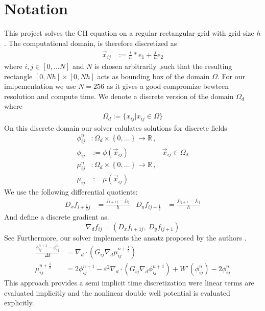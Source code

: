 \documentclass{mimosis}
\begin{document}
\section{Notation}
\label{sec:org9f007ea}
This project solves the CH equation on a regular rectangular grid with grid-size \(h\). The computational domain, is therefore discretized as
\begin{align}
\label{eq:4}
\vec{x}_{ij} &:= \frac{i}{h} * e_{1} + \frac{j}{h} e_2
\end{align}
where \(i,j \in [0 , \dots N]\) and \(N\) is chosen arbitrarily ,such that the resulting rectangle \([0 , Nh] \times [0,Nh]\) acts as bounding box of the domain \(\Omega\). For our imlpementation we use \(N=256\) as it gives a good compromize bewteen resolution and compute time. We denote a discrete version of the domain \(\Omega_d\) where
\begin{align}
\label{eq:8}
\Omega_d := \{x_{ij} | x_{ij} \in \Omega\}
\end{align}
On this discrete domain our solver calulates solutions for discrete fields
\begin{align}
\label{eq:5}
\phi_{ij}^n &: \Omega_d \times \left\{ 0, \dots  \right\} \to \mathbb{R} \,,\\
\phi_{ij} &:= \phi(\vec{x}_{ij}) & \vec{x}_{ij} \in \Omega_{d} \\
\mu_{ij}^n &: \Omega_d \times \left\{ 0, \dots \right\} \to \mathbb{R} \,, \\
\mu_{ij} &:= \mu(\vec{x}_{ij})
\end{align}
We use the following differential quotients:
\begin{align}
D_xf_{i+\frac{1}{2} j} &= \frac{f_{i+1j} - f_{ij}}{h} & D_yf_{ij+\frac{1}{2}} &= \frac{f_{ij+1} - f_{ij}}{h}
\end{align}
And define a discrete gradient as.
\begin{equation}
\nabla_d f_{ij} = (D_x f_{i+1j} , \ D_y f_{ij+1})
\end{equation}
See \autocite{Ulmer_CHRelaxed_2024}
Furthermore, our solver implements the ansatz proposed by the authors \autocite{SHIN20117441}.
\begin{equation}
\label{eq:ansatz}
\begin{aligned}
\frac{\phi_{ij}^{n+1} - \phi_{ij}^n}{\Delta t}  &=  \nabla _d \cdot (G_{ij} \nabla_d \mu_{ij}^{n+\frac{1}{2}} )  \\
 \mu_{ij}^{n+\frac{1}{2}} &= 2\phi_{ij}^{n+1} - \varepsilon^2  \nabla_d \cdot  (G_{ij} \nabla _d \phi_{ij}^{n+1} ) + W'(\phi_{ij}^n) - 2\phi _{ij}^n
\end{aligned}
\end{equation}
This approach provides a semi implicit time discretization were linear terms are evaluated implicitly and the nonlinear double well potential is evaluated explicitly.
\end{document}
